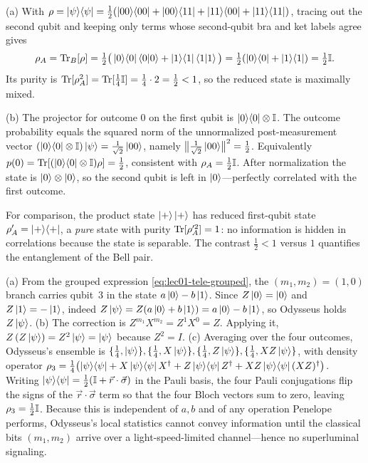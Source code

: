 \begin{solution}
(a) With $\rho=\ket{\psi}\!\bra{\psi}=\tfrac12(\ket{00}\!\bra{00}+\ket{00}\!\bra{11}+\ket{11}\!\bra{00}+\ket{11}\!\bra{11})$,
tracing out the second qubit and keeping only terms whose second-qubit bra and ket
labels agree gives
\[
  \rho_A=\operatorname{Tr}_B[\rho]=\tfrac12\big(\ket{0}\!\bra{0}\braket{0|0}+\ket{1}\!\bra{1}\braket{1|1}\big)
        =\tfrac12(\ket{0}\!\bra{0}+\ket{1}\!\bra{1})=\tfrac12\mathbb{I}.
\]
Its purity is $\operatorname{Tr}[\rho_A^{2}]=\operatorname{Tr}[\tfrac14\mathbb{I}]=\tfrac14\cdot2=\tfrac12<1$, so the
reduced state is maximally mixed.

(b) The projector for outcome $0$ on the first qubit is $\ket{0}\!\bra{0}\otimes\mathbb{I}$. The
outcome probability equals the squared norm of the unnormalized post-measurement
vector $(\ket{0}\!\bra{0}\otimes\mathbb{I})\ket{\psi}=\tfrac{1}{\sqrt2}\ket{00}$, namely
$\bigl\|\tfrac{1}{\sqrt2}\ket{00}\bigr\|^{2}=\tfrac12$. Equivalently
$p(0)=\operatorname{Tr}[(\ket{0}\!\bra{0}\otimes\mathbb{I})\rho]=\tfrac12$, consistent with $\rho_A=\tfrac12\mathbb{I}$.
After normalization the state is $\ket{0}\otimes\ket{0}$, so the second qubit is left
in $\ket{0}$---perfectly correlated with the first outcome.

For comparison, the product state $\ket{+}\ket{+}$ has reduced first-qubit state
$\rho_A'=\ket{+}\!\bra{+}$, a \emph{pure} state with purity $\operatorname{Tr}[\rho_A'^{2}]=1$: no
information is hidden in correlations because the state is separable. The contrast
$\tfrac12<1$ versus $1$ quantifies the entanglement of the Bell pair.
\end{solution}

\begin{solution}
(a) From the grouped expression \eqref{eq:lec01-tele-grouped}, the $(m_1,m_2)=(1,0)$
branch carries qubit~$3$ in the state $a\ket{0}-b\ket{1}$. Since $Z\ket{0}=\ket{0}$ and
$Z\ket{1}=-\ket{1}$, indeed $Z\ket{\psi}=Z(a\ket{0}+b\ket{1})=a\ket{0}-b\ket{1}$, so
Odysseus holds $Z\ket{\psi}$.
(b) The correction is $Z^{m_1}X^{m_2}=Z^{1}X^{0}=Z$. Applying it,
$Z\,(Z\ket{\psi})=Z^2\ket{\psi}=\ket{\psi}$ because $Z^2=I$.
(c) Averaging over the four outcomes, Odysseus's ensemble is
$\{\tfrac14,\ket{\psi}\},\{\tfrac14,X\ket{\psi}\},\{\tfrac14,Z\ket{\psi}\},\{\tfrac14,XZ\ket{\psi}\}$,
with density operator $\rho_3=\tfrac14\bigl(\ket{\psi}\!\bra{\psi}+X\ket{\psi}\!\bra{\psi}X^{\dagger}+Z\ket{\psi}\!\bra{\psi}Z^{\dagger}+XZ\ket{\psi}\!\bra{\psi}(XZ)^{\dagger}\bigr)$.
Writing $\ket{\psi}\!\bra{\psi}=\tfrac12(\mathbb{I}+\vec r\cdot\vec\sigma)$ in the Pauli basis,
the four Pauli conjugations flip the signs of the $\vec r\cdot\vec\sigma$ term so that
the four Bloch vectors sum to zero, leaving $\rho_3=\tfrac12\mathbb{I}$. Because this is
independent of $a,b$ and of any operation Penelope performs, Odysseus's local statistics cannot
convey information until the classical bits $(m_1,m_2)$ arrive over a light-speed-limited
channel---hence no superluminal signaling.
\end{solution}


